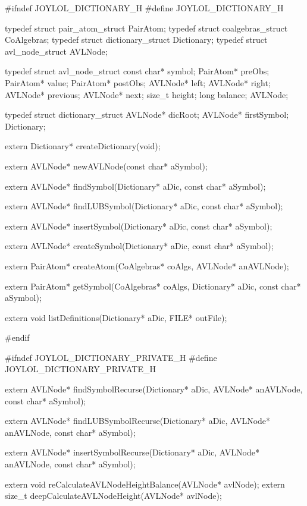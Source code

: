 \starttyping
#ifndef JOYLOL_DICTIONARY_H
#define JOYLOL_DICTIONARY_H

typedef struct pair_atom_struct PairAtom;
typedef struct coalgebras_struct CoAlgebras;
typedef struct dictionary_struct Dictionary;
typedef struct avl_node_struct AVLNode;

typedef struct avl_node_struct {
  const char* symbol;
  PairAtom*   preObs;
  PairAtom*   value;
  PairAtom*   postObs;
  AVLNode*    left;
  AVLNode*    right;
  AVLNode*    previous;
  AVLNode*    next;
  size_t      height;
  long        balance;
} AVLNode;

typedef struct dictionary_struct {
  AVLNode*    dicRoot;
  AVLNode*    firstSymbol;
} Dictionary;

extern Dictionary* createDictionary(void);

extern AVLNode* newAVLNode(const char* aSymbol);

extern AVLNode* findSymbol(Dictionary* aDic, const char* aSymbol);

extern AVLNode* findLUBSymbol(Dictionary* aDic, const char* aSymbol);

extern AVLNode* insertSymbol(Dictionary* aDic, const char* aSymbol);

extern AVLNode* createSymbol(Dictionary* aDic, const char* aSymbol);

extern PairAtom* createAtom(CoAlgebras* coAlgs, AVLNode* anAVLNode);

extern PairAtom* getSymbol(CoAlgebras* coAlgs,
                           Dictionary* aDic,
                           const char* aSymbol);

extern void listDefinitions(Dictionary* aDic, FILE* outFile);

#endif
\stoptyping

\starttyping
#ifndef JOYLOL_DICTIONARY_PRIVATE_H
#define JOYLOL_DICTIONARY_PRIVATE_H

extern AVLNode* findSymbolRecurse(Dictionary* aDic,
                                  AVLNode* anAVLNode,
                                  const char* aSymbol);

extern AVLNode* findLUBSymbolRecurse(Dictionary* aDic,
                                     AVLNode* anAVLNode,
                                     const char* aSymbol);

extern AVLNode* insertSymbolRecurse(Dictionary* aDic,
                                    AVLNode* anAVLNode,
                                    const char* aSymbol);


extern void reCalculateAVLNodeHeightBalance(AVLNode* avlNode);
extern size_t deepCalculateAVLNodeHeight(AVLNode* avlNode);


